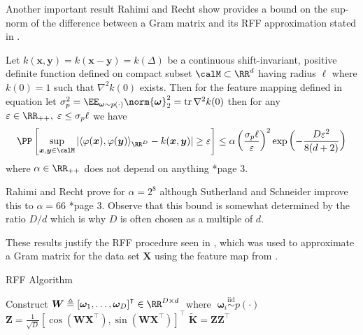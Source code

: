 Another important result Rahimi and Recht show provides a bound on the sup-norm of the difference between a Gram matrix and its RFF approximation stated in .

\begin{prop} \label{prop: rff_sup-norm_bound_1}
    Let $k(\bm{x} , \bm{y}) = k(\bm{x} - \bm{y}) = k( \Delta)$ be a continuous shift-invariant, positive definite function defined on compact subset $\calM \subset \RR^d$ having radius $\ell$ where $k(0) = 1$ such that $\nabla^2 k(0)$ exists. Then for the feature mapping defined in equation   let $\sigma_p^2 = \EE_{\bm{\omega} \sim p(\cdot)} \norm{\bm{\omega}}^2_2 = \operatorname{tr} \nabla^2 k(0)$ then for any $\varepsilon \in \RR_{++}, \; \varepsilon \leq \sigma_p \ell$ we have
    \[
        \PP \left[ \sup_{\bm{x},\bm{y} \in \calM} \left| \langle \varphi (\bm{x}) , \varphi (\bm{y}) \rangle_{\RR^D} - k (\bm{x},\bm{y}) \right| \geq \varepsilon \right] \leq \alpha \left( \frac{\sigma_p \ell}{\varepsilon} \right)^2 \exp \left( - \frac{D \varepsilon^2}{8(d+2)} \right)
    \]
    where $\alpha \in \RR_{++}$ does not depend on anything \cite{NIPS2007_013a006f}*{page 3}.
\end{prop}

Rahimi and Recht prove  for $\alpha = 2^8$ although Sutherland and Schneider improve this to $\alpha = 66$ \cite{sutherland2015error}*{page 3}. Observe that this bound is somewhat determined by the ratio $D/d$ which is why $D$ is often chosen as a multiple of $d$.

These results justify the RFF procedure seen in , which was used to approximate a Gram matrix for the data set $\bm{X}$ using the feature map from  .

{\centering
\begin{minipage}{.85\linewidth}
    \begin{algorithm}[H]
        \caption{RFF Algorithm}
        \label{alg: RFF-algorithm}
        \SetAlgoLined
        \DontPrintSemicolon

        \BlankLine
        Construct $\bm{W} \triangleq \left[ \bm{\omega}_1 ,\ldots , \bm{\omega}_D \right]^{\intercal} \in \RR^{D \times d} \;$ where $\; \bm{\omega}_i \stackrel{\text{iid}}{\sim} p(\cdot)$\;
        $\bm{Z} = \frac{1}{\sqrt{D}} \left[ \cos \left( \bm{W} \bm{X}^{\intercal} \right), \sin \left( \bm{W} \bm{X}^{\intercal} \right) \right]^{\intercal}$\;
        $\bm{\widetilde{K}} = \bm{Z}\bm{Z}^{\intercal}$\;
        \BlankLine
    \end{algorithm}
\end{minipage}
\par
}

